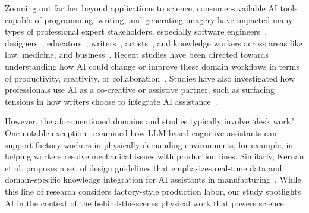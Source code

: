 Zooming out farther beyond applications to science, consumer-available AI tools capable of programming, writing, and generating imagery have impacted many types of professional expert stakeholders, especially software engineers~\cite{zheng2025towards, vaithilingam2022expectation, khojah2024beyond, liu2023code}, designers~\cite{subramonyam2025prototyping, zhu2018explainable, shi2023understanding}, educators~\cite{prather2025beyond}, writers~\cite{guo2025from, ippolito2022creative}, artists~\cite{chang2023the, tang2024whats, suh2021ai}, and knowledge workers across areas like law, medicine, and business~\cite{amershi2019guidelines, fok2024marco}. Recent studies have been directed towards understanding how AI could change or improve these domain workflows in terms of productivity, creativity, or collaboration~\cite{vanukuru2025designing, pu2025assistance, suh2024luminate}. Studies have also investigated how professionals use AI as a co-creative or assistive partner, such as surfacing tensions in how writers choose to integrate AI assistance~\cite{guo2025from}.

However, the aforementioned domains and studies typically involve `desk work.' One notable exception~\cite{kernan2023harnessing} examined how LLM-based cognitive assistants can support factory workers in physically-demanding environments, for example, in helping workers resolve mechanical issues with production lines. Similarly, Kernan et al. proposes a set of design guidelines that emphasizes real-time data and domain-specific knowledge integration for AI assistants in manufacturing~\cite{kernan2023harnessing}. While this line of research considers factory-style production labor, our study spotlights AI in the context of the behind-the-scenes physical work that powers science.